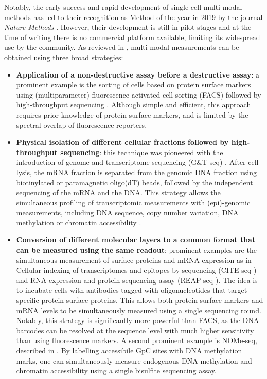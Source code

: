 Notably, the early success and rapid development of single-cell multi-modal methods has led to their recognition as Method of the year in 2019 by the journal \textit{Nature Methods} \cite{NatMethods2020}. However, their development is still in pilot stages and at the time of writing there is no commercial platform available, limiting its widespread use by the community. As reviewed in \cite{Stuart2019,Chappell2018}, multi-modal measurements can be obtained using three broad strategies:
\begin{itemize}
	
	\item \textbf{Application of a non-destructive assay before a destructive assay}: a prominent example is the sorting of cells based on protein surface markers using (multiparameter) fluorescence-activated cell sorting (FACS) followed by high-throughput sequencing \cite{Paul2015}. Although simple and efficient, this approach requires prior knowledge of protein surface markers, and is limited by the spectral overlap of fluorescence reporters.

	\item \textbf{Physical isolation of different cellular fractions followed by high-throughput sequencing}: this technique was pioneered with the introduction of genome and transcriptome sequencing (G\&T-seq) \cite{Macaulay2015}. After cell lysis, the mRNA fraction is separated from the genomic DNA fraction using biotinylated or paramagnetic oligo(dT) beads, followed by the independent sequencing of the mRNA and the DNA. This strategy allows the simultaneous profiling of transcriptomic measurements with (epi)-genomic measurements, including DNA sequence, copy number variation, DNA methylation or chromatin accessibility \cite{Macaulay2015,Hou2016,Angermueller2016,Hu2016}.

	\item \textbf{Conversion of different molecular layers to a common format that can be measured using the same readout}: prominent examples are the simultaneous measurement of surface proteins and mRNA expression as in Cellular indexing of transcriptomes and epitopes by sequencing (CITE-seq \cite{Stoeckius2017}) and RNA expression and protein sequencing assay (REAP-seq \cite{Peterson2017}). The idea is to incubate cells with antibodies tagged with oligonucleotides that target specific protein surface proteins. This allows both protein surface markers and mRNA levels to be simultaneously measured using a single sequencing round. Notably, this strategy is significantly more powerful than FACS, as the DNA barcodes can be resolved at the sequence level with much higher sensitivity than using fluorescence markers. A second prominent example is NOMe-seq, described in . By labelling accessibile GpC sites with DNA methylation marks, one can simultaneously measure endogenous DNA methylation and chromatin accessibility using a single bisulfite sequencing assay.
\end{itemize}

